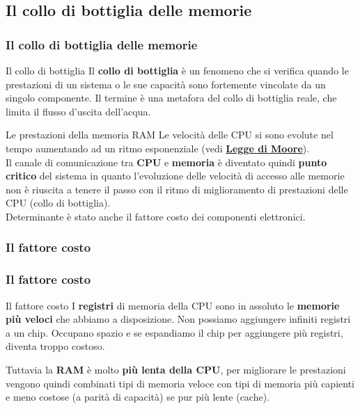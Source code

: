 \subsection[Il collo di bottiglia delle memorie]{Il collo di bottiglia delle memorie}
\begin{frame}
	\frametitle{Il collo di bottiglia delle memorie}
	 
	\begin{block}{Il collo di bottiglia}
		Il \textbf{collo di bottiglia} è un fenomeno che si verifica quando le prestazioni di un sistema o le sue capacità sono fortemente vincolate da un singolo componente. Il termine è una metafora del collo di bottiglia reale, che limita il flusso d'uscita dell'acqua.
	\end{block}
	\pause
	\begin{block}{Le prestazioni della memoria RAM}
		Le velocità delle CPU si sono evolute nel tempo aumentando ad un ritmo esponenziale (vedi \hyperlink{subsub:moore_law}{\textbf{Legge di Moore}}).\\
		
		Il canale di comunicazione tra \textbf{CPU} e \textbf{memoria} è diventato quindi \textbf{punto critico} del sistema in quanto l'evoluzione delle velocità di accesso alle memorie non è riuscita a tenere il passo con il ritmo di miglioramento di prestazioni delle CPU (collo di bottiglia).\\
		Determinante è stato anche il fattore costo dei componenti elettronici.
	\end{block}
	
\end{frame}


\subsubsection[Il fattore costo]{Il fattore costo}
\begin{frame}
	\frametitle{Il fattore costo}
	
	\begin{block}{Il fattore costo}
		I \textbf{registri} di memoria della CPU sono in assoluto le \textbf{memorie più veloci} che abbiamo a disposizione. Non possiamo aggiungere infiniti registri a un chip. Occupano spazio e se espandiamo il chip per aggiungere più registri, diventa troppo costoso.\\\vspace{0.8em}
		
		Tuttavia la \textbf{RAM} è molto \textbf{più lenta della CPU}, per migliorare le prestazioni vengono quindi combinati tipi di memoria veloce con tipi di memoria più capienti e meno costose (a parità di capacità) se pur più lente (cache).
	\end{block}
	
\end{frame}


